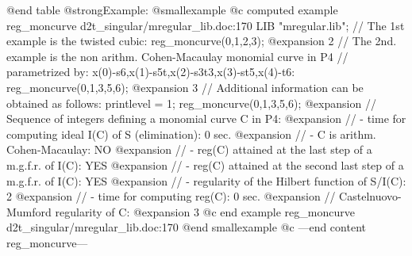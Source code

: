@end table
@strong{Example:}
@smallexample
@c computed example reg_moncurve d2t_singular/mregular_lib.doc:170 
LIB "mregular.lib";
// The 1st example is the twisted cubic:
reg_moncurve(0,1,2,3);
@expansion{} 2
// The 2nd. example is the non arithm. Cohen-Macaulay monomial curve in P4
// parametrized by: x(0)-s6,x(1)-s5t,x(2)-s3t3,x(3)-st5,x(4)-t6:
reg_moncurve(0,1,3,5,6);
@expansion{} 3
// Additional information can be obtained as follows:
printlevel = 1;
reg_moncurve(0,1,3,5,6);
@expansion{} // Sequence of integers defining a monomial curve C in P4:
@expansion{} //   - time for computing ideal I(C) of S (elimination): 0 sec.
@expansion{} //   - C is arithm. Cohen-Macaulay: NO
@expansion{} //   - reg(C) attained at the last step of a m.g.f.r. of I(C): YES
@expansion{} //   - reg(C) attained at the second last step of a m.g.f.r. of I(C): YES
@expansion{} //   - regularity of the Hilbert function of S/I(C): 2
@expansion{} //   - time for computing reg(C): 0 sec.
@expansion{} // Castelnuovo-Mumford regularity of C:
@expansion{} 3
@c end example reg_moncurve d2t_singular/mregular_lib.doc:170
@end smallexample
@c ---end content reg_moncurve---
